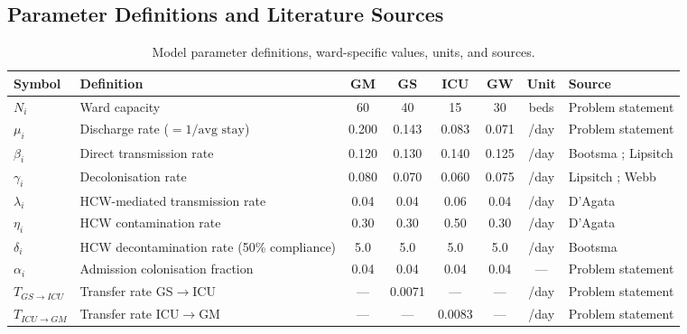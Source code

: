 \documentclass[12pt,a4paper]{article}
\begin{document}
\subsection{Parameter Definitions and Literature Sources}

\begin{table}[H]
  \centering
  \caption{Model parameter definitions, ward-specific values, units, and sources.}
  \label{tab:parameter-definitions}
  \begin{tabular}{>{\raggedright\arraybackslash}p{1.4cm} >{\raggedright\arraybackslash}p{3.8cm} c c c c c >{\raggedright\arraybackslash}p{3.2cm}}
    \toprule
    Symbol & Definition & GM & GS & ICU & GW & Unit & Source \\
    \midrule
    $N_i$ & Ward capacity & 60 & 40 & 15 & 30 & beds & Problem statement \\
    $\mu_i$ & Discharge rate ($= 1/\text{avg stay}$) & 0.200 & 0.143 & 0.083 & 0.071 & /day & Problem statement \\
    $\beta_i$ & Direct transmission rate & 0.120 & 0.130 & 0.140 & 0.125 & /day & Bootsma \cite{bootsma_preprint}; Lipsitch \cite{lipsitch2000} \\
    $\gamma_i$ & Decolonisation rate & 0.080 & 0.070 & 0.060 & 0.075 & /day & Lipsitch \cite{lipsitch2000}; Webb \cite{webb2005} \\
    $\lambda_i$ & HCW-mediated transmission rate & 0.04 & 0.04 & 0.06 & 0.04 & /day & D'Agata \cite{dagata2007} \\
    $\eta_i$ & HCW contamination rate & 0.30 & 0.30 & 0.50 & 0.30 & /day & D'Agata \cite{dagata2007} \\
    $\delta_i$ & HCW decontamination rate (50\% compliance) & 5.0 & 5.0 & 5.0 & 5.0 & /day & Bootsma \cite{bootsma_preprint} \\
    $\alpha_i$ & Admission colonisation fraction & 0.04 & 0.04 & 0.04 & 0.04 & --- & Problem statement \\
    $T_{GS \to ICU}$ & Transfer rate GS$\to$ICU & --- & 0.0071 & --- & --- & /day & Problem statement \\
    $T_{ICU \to GM}$ & Transfer rate ICU$\to$GM & --- & --- & 0.0083 & --- & /day & Problem statement \\
    \bottomrule
  \end{tabular}
\end{table}
\end{document}
